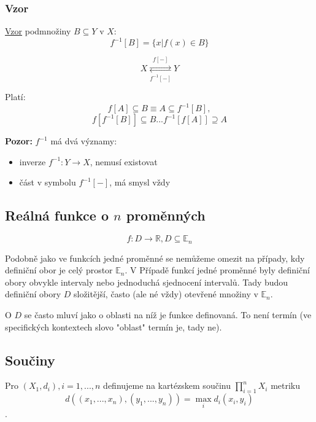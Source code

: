 \documentclass[../main.tex]{subfiles}
\begin{document}
\subsubsection{Vzor}
\hspace{1.2mm}
\underline{Vzor} podmnožiny $B\subseteq Y$ v $X$:
\[f^{-1}[B] = \{x | f(x) \in B\}\]

\[X \underset{f^{-1}[-]}{\stackrel{f[-]}{\rightleftarrows}} Y\]

Platí:
\[f[A] \subseteq B \equiv A \subseteq f^{-1}[B],\]
\[f[f^{-1}[B]] \subseteq B  ...  f^{-1}[f[A]] \supseteq A\]


\textbf{Pozor:} $f^{-1}$ má dvá významy:
\begin{itemize}
    \item inverze $f^{-1}:Y \rightarrow X$, nemusí existovat
    \item část v symbolu $f^{-1}[-]$, má smysl vždy
 
\end{itemize}
\noindent

\subsection{Reálná funkce o $n$ proměnných}
\hspace{1.2mm}
\[f: D \rightarrow \mathbb{R}, D \subseteq \mathbb{E}_n\]

Podobně jako ve funkcích jedné proměnné se nemůžeme omezit na případy, kdy definiční obor je celý prostor $\mathbb{E}_n$. V 
Případě funkcí jedné proměnné byly definiční obory obvykle intervaly nebo jednoduchá sjednocení intervalů. Tady budou definiční
obory $D$ složitější, často (ale né vždy) otevřené množiny v $\mathbb{E}_n$.

O $D$ se často mluví jako o oblasti na níž je funkce definovaná. To není termín (ve specifických kontextech slovo "oblast" termín 
je, tady ne).
\noindent

\subsection{Součiny}
\hspace{1.2mm}
Pro $(X_1,d_i), i = 1,...,n$ definujeme na kartézskem součinu $\prod^n_{i=1}X_i$ metriku
\[d((x_1,...,x_n),(y_1,...,y_n)) = \max_i d_i(x_i,y_i)\].
\end{document}
